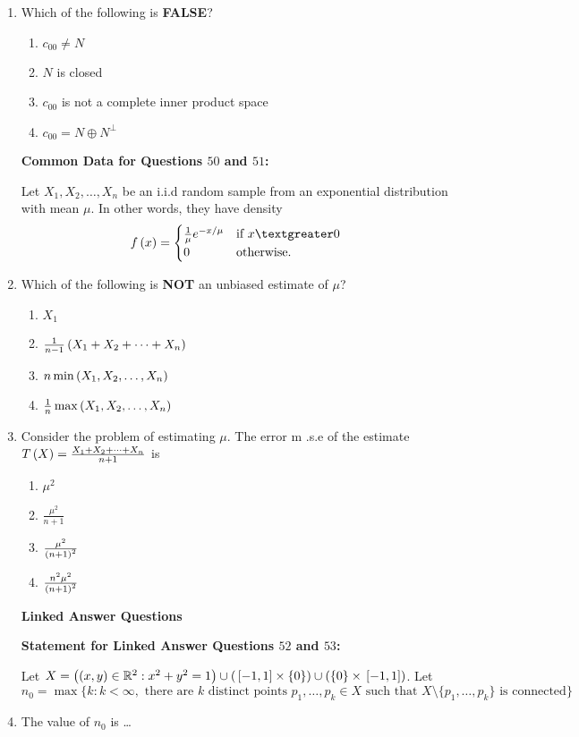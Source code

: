 \documentclass[journal,12pt,twocolumn]{IEEEtran}
\theoremstyle{remark}
\begin{document}
\begin{enumerate}[start=40]
    \item Which of the following is \textbf{FALSE}?
    \begin{enumerate}
        \item $c_{00} \neq N$
        \item $N$ is closed
        \item $c_{00}$ is not a complete inner product space
        \item $c_{00} = N \oplus N^{\perp}$
    \end{enumerate}
\textbf{ Common Data for Questions $50$ and $51$:}

    Let $X_1, X_2, \dots, X_n$ be an i.i.d random sample from an exponential distribution with mean $\mu$. In other words, they have density
    \[
    f \brak{x} = 
    \begin{cases}
      \frac{1}{\mu} e^{-x / \mu} & \text{if } x \textgreater 0 \\
      0 & \text{otherwise}.
    \end{cases}
    \]

    \item Which of the following is \textbf{NOT} an unbiased estimate of $\mu$?
    \begin{enumerate}
        \item $X_1$
        \item $\frac{1}{n-1} \left(X_1 + X_2 + \dots + X_n\right)$
        \item $n  \min \left(X_1, X_2, \dots, X_n\right)$
        \item $\frac{1}{n}  \max \left(X_1, X_2, \dots, X_n\right)$
    \end{enumerate}

    \item Consider the problem of estimating $\mu$. The  error m .s.e  of the estimate $T \left(X\right) = \frac{X_1 + X_2 + \dots + X_n}{n + 1}$ is
    \begin{enumerate}
        \item $\mu^2$
        \item $\frac{\mu^2}{n + 1}$
        \item $\frac{ \mu^2}{\left(n + 1\right)^2}$
        \item $\frac{n^2 \mu^2}{\left(n + 1\right)^2}$
    \end{enumerate}

\textbf{ Linked Answer Questions}

   \textbf{ Statement for Linked Answer Questions $52$ and $53$:}

    Let $X = \left(\left(x, y\right) \in \mathbb{R}^2 : x^2 + y^2 = 1\right) \cup \left({}\left[-1, 1\right] \times \{0\}\right) \cup \left(\{0\} \times {}\left[-1, 1\right]\right)$. Let $n_0 = \max \{k : k < \infty, \text{ there are } k \text{ distinct points } p_1, \dots, p_k \in X \text{ such that } X \setminus \{p_1, \dots, p_k\} \text{ is connected} \}$

    \item The value of $n_0$ is \dots







 
\end{enumerate}
\end{document}
